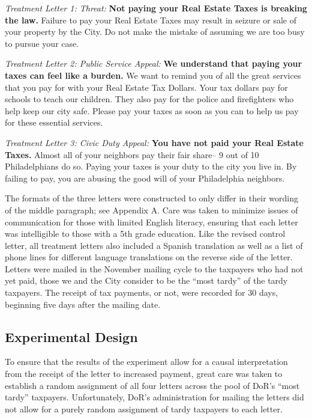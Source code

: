 \documentclass[12pt,titlepage]{article}
\begin{document}
{\it Treatment Letter 1: Threat: } {\bf Not paying your Real Estate
  Taxes is breaking the law.} Failure to pay your Real Estate Taxes
may result in seizure or sale of your property by the City. Do not
make the mistake of assuming we are too busy to pursue your case.

{\it Treatment Letter 2: Public Service Appeal: } {\bf We understand that
  paying your taxes can feel like a burden.} We want to remind you of
all the great services that you pay for with your Real Estate Tax
Dollars. Your tax dollars pay for schools to teach our children.  They
also pay for the police and firefighters who help keep our city safe.
Please pay your taxes as soon as you can to help us pay for these
essential services.
  
{ \it Treatment Letter 3: Civic Duty Appeal: } {\bf You have not paid your
  Real Estate Taxes.}  Almost all of your neighbors pay their fair
share-- 9 out of 10 Philadelphians do so. Paying your taxes is your
duty to the city you live in. By failing to pay, you are abusing the
good will of your Philadelphia neighbors.

The formats of the three letters were constructed to only differ in
their wording of the middle paragraph; see Appendix A.  Care was taken
to minimize issues of communication for those with limited English
literacy, ensuring that each letter was intelligible to those with a
5th grade education.  Like the revised control letter, all treatment
letters also included a Spanish translation as well as a list of phone
lines for different language translations on the reverse side of the
letter.  Letters were mailed in the November mailing cycle to the
taxpayers who had not yet paid,  those we and the City consider to
be the “most tardy” of the tardy taxpayers.  The receipt of tax payments, or not, were
recorded for 30 days, beginning five days after the mailing date.


\subsection{Experimental Design}

To ensure that the results of the experiment allow for a causal
interpretation from the receipt of the letter to increased payment,
great care was taken to establish a random assignment of all four
letters across the pool of DoR's ``most tardy'' taxpayers.  Unfortunately,
DoR's administration for mailing the letters did not allow for a
purely random assignment of tardy taxpayers to each letter.  
\end{document}
